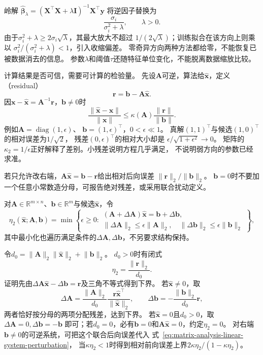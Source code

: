 岭解
$\widehat{\bm\beta}_\lambda
=(\bm X^\top\bm X+\lambda\bm I)^{-1}\bm X^\top\bm y$
将逆因子替换为
\begin{equation}
 \frac{\sigma_i}{\sigma_i^2+\lambda},\qquad \lambda>0.
 \label{eq:matrix-analysis-ridge-filter-factor}
\end{equation}
由于$\sigma_i^2+\lambda\geq2\sigma_i\sqrt\lambda$，其最大放大不超过
$1/(2\sqrt\lambda)$；训练拟合在该方向上则乘以
$\sigma_i^2/(\sigma_i^2+\lambda)<1$，引入收缩偏差。
零奇异方向两种方法都给零，不能恢复已被数据消去的信息。
参数$\lambda$和阈值$\tau$还随特征单位变化，不能脱离数据缩放比较。

计算结果是否可信，需要可计算的检验量。
先设$\bm A$可逆，算法给$\widehat{\bm x}$，定义（residual）
\begin{equation}
 \bm r=\bm b-\bm A\widehat{\bm x}.
 \label{eq:matrix-analysis-residual}
\end{equation}
因$\bm x-\widehat{\bm x}=\bm A^{-1}\bm r$，$\bm b\neq0$时
\[
 \frac{\lVert\widehat{\bm x}-\bm x\rVert}{\lVert\bm x\rVert}
 \leq\kappa(\bm A)\frac{\lVert\bm r\rVert}{\lVert\bm b\rVert}.
\]
例如$\bm A=\operatorname{diag}(1,\epsilon)$、
$\bm b=(1,\epsilon)^\top$，$0<\epsilon\ll1$。
真解$(1,1)^\top$与候选$(1,0)^\top$的相对误差为$1/\sqrt2$，
残差$(0,\epsilon)^\top$的相对大小却是
$\epsilon/\sqrt{1+\epsilon^2}\to0$。
矩阵的$\kappa_2=1/\epsilon$正好解释了差别。小残差说明方程几乎满足，
不说明弱方向的参数已经求准。

若只允许改右端，$\bm A\widehat{\bm x}=\bm b-\bm r$给出相对后向误差
$\lVert\bm r\rVert_2/\lVert\bm b\rVert_2$。
$\bm b=0$时不要加一个任意小常数造分母，可报告绝对残差，或采用联合扰动定义。
\begin{definition}[线性系统的范数型相对后向误差]
\label{def:matrix-analysis-normwise-backward-error}
对$\bm A\in\mathbb R^{m\times n}$、$\bm b\in\mathbb R^m$与候选$\widehat{\bm x}$，令
\[
 \eta_2(\widehat{\bm x};\bm A,\bm b)
 =\min\left\{\epsilon\geq0:
 \begin{array}{l}
  (\bm A+\Delta\bm A)\widehat{\bm x}=\bm b+\Delta\bm b,\\
  \lVert\Delta\bm A\rVert_2\leq\epsilon\lVert\bm A\rVert_2,\quad
  \lVert\Delta\bm b\rVert_2\leq\epsilon\lVert\bm b\rVert_2
 \end{array}\right\},
\]
其中最小化也遍历满足条件的$\Delta\bm A,\Delta\bm b$，不另要求结构保持。
\end{definition}
令$d_0=\lVert\bm A\rVert_2\lVert\widehat{\bm x}\rVert_2+\lVert\bm b\rVert_2$。
$d_0>0$时有闭式
\[
 \eta_2=\frac{\lVert\bm r\rVert_2}{d_0}.
\]
证明先由$\Delta\bm A\widehat{\bm x}-\Delta\bm b=\bm r$及三角不等式得到下界。
若$\widehat{\bm x}\neq0$，取
\[
 \Delta\bm A=
 \frac{\lVert\bm A\rVert_2}{d_0}
 \frac{\bm r\widehat{\bm x}^\top}{\lVert\widehat{\bm x}\rVert_2},
 \qquad
 \Delta\bm b=-\frac{\lVert\bm b\rVert_2}{d_0}\bm r,
\]
两者恰好按分母的两项分配残差，达到下界。
若$\widehat{\bm x}=0$且$d_0>0$，取$\Delta\bm A=0,\Delta\bm b=-\bm b$
即可；若$d_0=0$，必有$\bm b=0$和$\bm A\widehat{\bm x}=0$，约定$\eta_2=0$。
对右端$\bm b\neq0$的可逆系统，可把这个联合后向误差代入
式~\eqref{eq:matrix-analysis-linear-system-perturbation}，
当$\kappa\eta_2<1$时得到相对前向误差上界$2\kappa\eta_2/(1-\kappa\eta_2)$。

